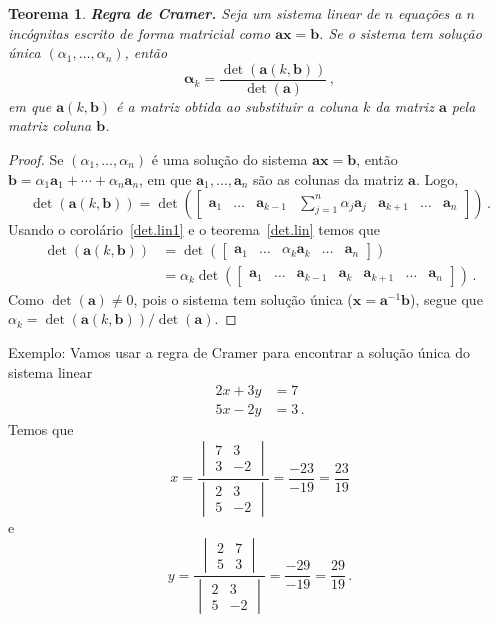 \documentclass[12pt,a4paper]{report}
\newcommand{\tb}{\textbf}
\newcommand{\tbu}[1]{\tb{\textup{#1}}}
\newcommand{\mb}{\mathbf}
\newcommand{\dpar}[1]{\left(#1\right)}
\newtheorem{thm}{Teorema}[chapter]
\begin{document}
\begin{thm}
  \tbu{Regra de Cramer.}
  Seja um sistema linear de $n$ equações a $n$ incógnitas escrito de forma matricial como $\mb {ax}=\mb b$. Se o sistema tem solução única $(\alpha_1,\ldots,\alpha_n)$, então
  $$\mb \alpha_k=\frac{\det(\mb a(k,\mb b))}{\det(\mb a)}\,,$$
  em que $\mb a(k,\mb b)$ é a matriz obtida ao substituir a coluna $k$ da matriz $\mb a$ pela matriz coluna $\mb b$.
\end{thm}
\begin{proof}
  Se $(\alpha_1,\ldots,\alpha_n)$ é uma solução do sistema $\mb {ax}=\mb b$, então $\mb b=\alpha_1\mb a_1+\cdots+\alpha_n\mb a_n$, em que $\mb a_1,\ldots,\mb a_n$ são as colunas da matriz $\mb a$. Logo,
  $$\det(\mb a(k,\mb b))=\det\dpar{\begin{bmatrix}
    \mb a_1&\ldots&\mb a_{k-1}&\sum_{j=1}^n\alpha_j\mb a_j&\mb a_{k+1}&\ldots&\mb a_n
  \end{bmatrix}}\,.$$
  Usando o corolário~\ref{det.lin1} e o teorema~\ref{det.lin} temos que
  \begin{equation*}
    \begin{split}
      \det(\mb a(k,\mb b))&=\det\dpar{\begin{bmatrix}
        \mb a_1&\ldots&\alpha_k\mb a_k&\ldots&\mb a_n
      \end{bmatrix}}\\
      &=\alpha_k\det\dpar{\begin{bmatrix}
        \mb a_1&\ldots&\mb a_{k-1}&\mb a_k&\mb a_{k+1}&\ldots&\mb a_n
      \end{bmatrix}}\,.
    \end{split}
  \end{equation*}
  Como $\det(\mb a)\ne 0$, pois o sistema tem solução única ($\mb x=\mb a^{-1}\mb b$), segue que $\alpha_k=\det(\mb a(k,\mb b))/\det(\mb a)$.
\end{proof}

Exemplo: Vamos usar a regra de Cramer para encontrar a solução única do sistema linear
\begin{equation*}
  \begin{split}
    2x+3y&=7\\
    5x-2y&=3\,.
  \end{split}
\end{equation*}
Temos que
$$x=\frac{\begin{vmatrix}
  7&3\\
  3&-2
\end{vmatrix}}{\begin{vmatrix}
  2&3\\
  5&-2
\end{vmatrix}}=\frac{-23}{-19}=\frac{23}{19}$$
e
$$y=\frac{\begin{vmatrix}
  2&7\\
  5&3
\end{vmatrix}}{\begin{vmatrix}
  2&3\\
  5&-2
\end{vmatrix}}=\frac{-29}{-19}=\frac{29}{19}\,.$$
\end{document}

